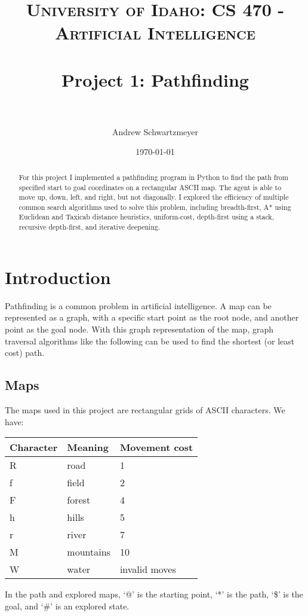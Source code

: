 \documentclass[12pt, article]{scrartcl}
\title{	
\normalfont \normalsize 
\textsc{University of Idaho: CS 470 - Artificial Intelligence} \\ [25pt]
\horrule{0.5pt} \\[0.4cm]
\huge Project 1: Pathfinding\\
\horrule{2pt} \\[0.5cm]
}
\author{Andrew Schwartzmeyer}
\date{\normalsize\today}
\begin{document}
\maketitle %
\begin{abstract}
For this project I implemented a pathfinding program in Python to find the path from specified start to goal coordinates on a rectangular ASCII map. The agent is able to move up, down, left, and right, but not diagonally. I explored the efficiency of multiple common search algorithms used to solve this problem, including breadth-first, A* using Euclidean and Taxicab distance heuristics, uniform-cost, depth-first using a stack, recursive depth-first, and iterative deepening. \\
\end{abstract}
\pagebreak
\section{Introduction}
Pathfinding is a common problem in artificial intelligence. A map can be represented as a graph, with a specific start point as the root node, and another point as the goal node. With this graph representation of the map, graph traversal algorithms like the following can be used to find the shortest (or least cost) path. \\
\subsection{Maps}
The maps used in this project are rectangular grids of ASCII characters. We have: \\
\begin{center}
\begin{tabular}{l | l | l}
Character & Meaning & Movement cost \\ \hline
R & road & 1 \\
f & field & 2 \\
F & forest & 4 \\
h & hills & 5 \\
r & river & 7 \\
M & mountains & 10 \\
W & water & invalid moves \\
\end{tabular}
\end{center}

In the path and explored maps, `@' is the starting point, `*' is the path, `\$' is the goal, and `\#' is an explored state. \\ 
\end{document}
